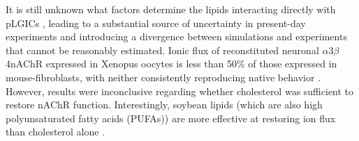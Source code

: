 \documentclass{article}
\begin{document}
It is still unknown what factors determine the lipids interacting directly with pLGICs , leading to a substantial source of uncertainty in present-day experiments and introducing a divergence between simulations and experiments that cannot be reasonably estimated. Ionic flux of reconstituted neuronal $\alpha$3$\beta$4nAChR expressed in Xenopus oocytes is less than 50\% of those expressed in mouse-fibroblasts, with neither consistently reproducing native behavior \cite{Fong_Correlation_1986,Sunshine_Lipid_1992,Hamouda_Assessing_2006,Butler_FTIR_1993,Bhushan_Correlation_1993,Fong_Stabilization_1987,Bednarczyk_Transmembrane_2002,Corrie_Lipid_2002}. However, results were inconclusive regarding whether cholesterol was sufficient to restore nAChR function. Interestingly, soybean lipids (which are also high polyunsaturated fatty acids (PUFAs)) \cite{Yoshida1986,Regost2003,Olsen2003} are more effective at restoring ion flux than cholesterol alone \cite{Morales2006}.%


\end{document}
